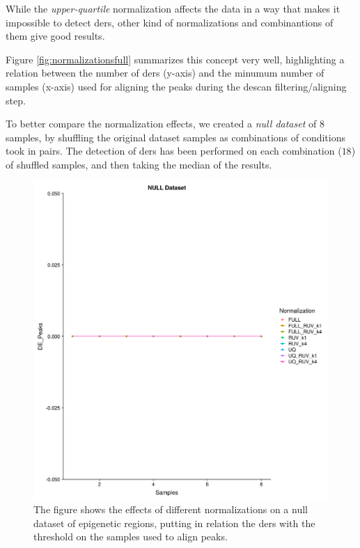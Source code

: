 While the \textit{upper-quartile} normalization affects the data in a way that makes it impossible to detect \glspl{der}, other kind of normalizations and combinantions of them give good results.

Figure \ref{fig:normalizationsfull} summarizes this concept very well, highlighting a relation between the number of \glspl{der} (y-axis) and the minumum number of samples (x-axis) used for aligning the peaks during the \gls{descan} filtering/aligning step.

To better compare the normalization effects, we created a \textit{null dataset} of 8 samples, by shuffling the original dataset samples as combinations of conditions took in pairs.
The detection of \glspl{der} has been performed on each combination ($18$) of shuffled samples, and then taking the median of the results.

\begin{figure}[H]
\centering
\includegraphics[width=\textwidth, height=\textheight, keepaspectratio]{img/descan2/null_dataset_final.pdf}
\caption[Normalizations applied to null dataset]{The figure shows the effects of different normalizations on a null dataset of epigenetic regions, putting in relation the \glspl{der} with the threshold on the samples used to align peaks.}
\label{fig:normalizationsnull}
\centering
\end{figure}


